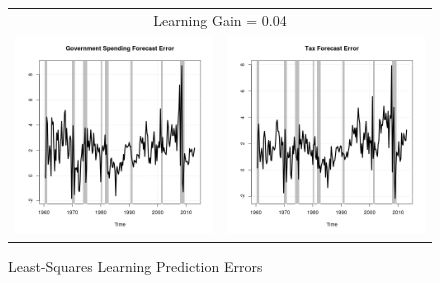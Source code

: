 \documentclass[11pt]{article}
\begin{document}
\begin{figure}\caption{Least-Squares Learning Prediction Errors}\label{fg:fe0.04}
\begin{center}
\begin{tabular}{cc}
\multicolumn{2}{c}{Learning Gain = 0.04} \\ [0.5pc]
\includegraphics[scale=0.45]{./results/pics0.04/fe_gov.png} & \includegraphics[scale=0.45]{./results/pics0.04/fe_tax.png} \\

\end{tabular}
\end{center}
\end{figure}
\end{document}
